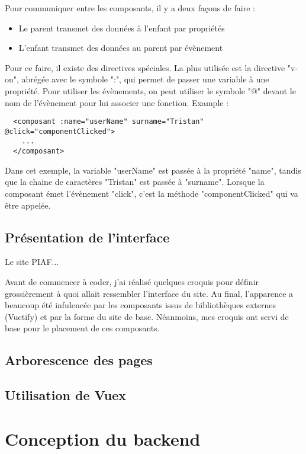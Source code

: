 \documentclass[
    iai, %
    eai, %
]{heig-tb}
\begin{document}
\inputminted[breaklines]{html}{assets/code/component_example.vue}

Pour communiquer entre les composants, il y a deux façons de faire :
\begin{itemize}
  \item Le parent transmet des données à l'enfant par propriétés
  \item L'enfant transmet des données au parent par évènement
\end{itemize}
\bigskip
Pour ce faire, il existe des directives spéciales.
La plus utilisée est la directive "v-on", abrégée avec le symbole ":", qui permet de passer une variable à une propriété.
Pour utiliser les évènements, on peut utiliser le symbole "@" devant le nom de l'évènement pour lui associer une fonction.
Example : \begin{verbatim}
  <composant :name="userName" surname="Tristan" @click="componentClicked">
    ...
  </composant>
\end{verbatim}
Dans cet exemple, la variable "userName" est passée à la propriété "name", tandis que la chaine de caractères "Tristan" est passée à "surname".
Lorsque la composant émet l'évènement "click", c'est la méthode "componentClicked" qui va être appelée.





\section{Présentation de l'interface}
Le site PIAF...

Avant de commencer à coder, j'ai réalisé quelques croquis pour définir grossièrement à quoi allait ressembler l'interface du site.
Au final, l'apparence a beaucoup été infulencée par les composants issus de bibliothèques externes (Vuetify) et par la forme du site de base.
Néanmoins, mes croquis ont servi de base pour le placement de ces composants.



\section{Arborescence des pages}
\section{Utilisation de Vuex}

\chapter{Conception du backend}
\end{document}
